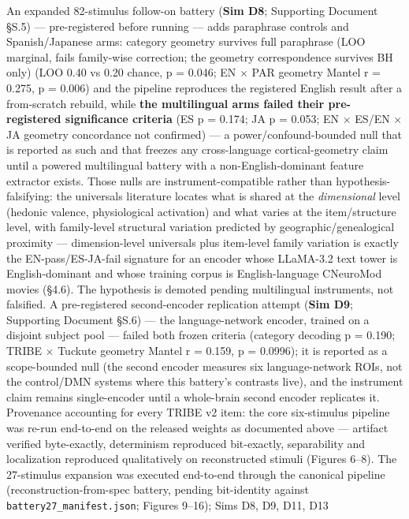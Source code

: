 \documentclass[
]{article}
\begin{document}
An expanded 82-stimulus follow-on battery (\textbf{Sim D8}; Supporting
Document §S.5) --- pre-registered before running --- adds paraphrase
controls and Spanish/Japanese arms: category geometry survives full
paraphrase (LOO marginal, fails family-wise correction; the geometry
correspondence survives BH only) (LOO 0.40 vs 0.20 chance, p = 0.046; EN
\(\times\) PAR geometry Mantel r = 0.275, p = 0.006) and the pipeline
reproduces the registered English result after a from-scratch rebuild,
while \textbf{the multilingual arms failed their pre-registered
significance criteria} (ES p = 0.174; JA p = 0.053; EN \(\times\) ES/EN
\(\times\) JA geometry concordance not confirmed) --- a
power/confound-bounded null that is reported as such and that freezes
any cross-language cortical-geometry claim until a powered multilingual
battery with a non-English-dominant feature extractor exists. Those
nulls are instrument-compatible rather than hypothesis-falsifying: the
universals literature locates what is shared at the \emph{dimensional}
level (hedonic valence, physiological activation) and what varies at the
item/structure level, with family-level structural variation predicted
by geographic/genealogical proximity --- dimension-level universals plus
item-level family variation is exactly the EN-pass/ES-JA-fail signature
for an encoder whose LLaMA-3.2 text tower is English-dominant and whose
training corpus is English-language CNeuroMod movies (§4.6). The
hypothesis is demoted pending multilingual instruments, not falsified. A
pre-registered second-encoder replication attempt (\textbf{Sim D9};
Supporting Document §S.6) --- the language-network encoder, trained on a
disjoint subject pool --- failed both frozen criteria (category decoding
p = 0.190; TRIBE \(\times\) Tuckute geometry Mantel r = 0.159, p =
0.0996); it is reported as a scope-bounded null (the second encoder
measures six language-network ROIs, not the control/DMN systems where
this battery's contrasts live), and the instrument claim remains
single-encoder until a whole-brain second encoder replicates it.
Provenance accounting for every TRIBE v2 item: the core six-stimulus
pipeline was re-run end-to-end on the released weights as documented
above --- artifact verified byte-exactly, determinism reproduced
bit-exactly, separability and localization reproduced qualitatively on
reconstructed stimuli (Figures 6--8). The 27-stimulus expansion was
executed end-to-end through the canonical pipeline
(reconstruction-from-spec battery, pending bit-identity against
\texttt{battery27\_manifest.json}; Figures 9--16); Sims D8, D9, D11, D13
\end{document}
